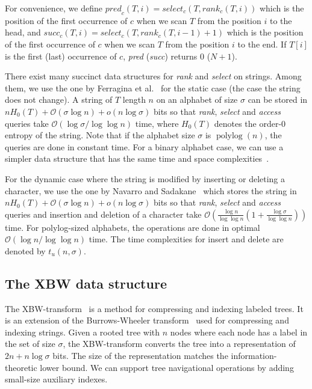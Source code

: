 \documentclass{llncs}
\newcommand{\Order}{\mathcal{O}}
\newcommand{\order}{o}
\def\polylog{{\mathop{\mathrm{polylog}}\nolimits}}
\def\rank{\textit{rank}}
\def\select{\textit{select}}
\def\access{\textit{access}}
\def\pred{\textit{pred}}
\def\succ{\textit{succ}}
\begin{document}
For convenience, we define ${\pred}_c(T,i) = {\select}_c(T, {\rank}_c(T, i))$
which is the position of the first occurrence of $c$ when we scan $T$ from the position $i$ to the head,
and ${\succ}_c(T,i) = {\select}_c(T, {\rank}_c(T, i-1)+1)$
which is the position of the first occurrence of $c$ when we scan $T$ from the position $i$ to the end.
If $T[i]$ is the first (last) occurrence of $c$, {\pred} (\succ) returns $0$ ($N+1$).


There exist many succinct data structures for {\rank} and {\select} on strings.
Among them, we use the one by Ferragina et al.~\cite{FerManMakNav06} for the static case
(the case the string does not change).  A string of $T$ length $n$ on an alphabet of size $\sigma$
can be stored in $nH_0(T) + \Order(\sigma \log n) + \order(n \log\sigma)$ bits so that
{\rank}, {\select} and {\access} queries take $\Order(\log\sigma / \log\log n)$ time,
where $H_0(T)$ denotes the order-$0$ entropy of the string.  Note that if the alphabet size $\sigma$
is $\polylog(n)$, the queries are done in constant time.  For a binary alphabet case,
we can use a simpler data structure that has the same time and space complexities~\cite{RRR07}.

For the dynamic case where the string is modified by inserting or deleting a character,
we use the one by Navarro and Sadakane~\cite{NavSad10} which stores the string
in $nH_0(T) + \Order(\sigma \log n) + \order(n \log\sigma)$ bits so that
{\rank}, {\select} and {\access} queries and insertion and deletion of a character take
$\Order(\frac{\log n}{\log \log n}(1+\frac{\log\sigma}{\log\log n}))$ time.
For polylog-sized alphabets, the operations are done in optimal $\Order(\log n/\log \log n)$ time.
The time complexities for insert and delete are denoted by $t_u(n,\sigma)$.


\subsection{The XBW data structure}
The XBW-transform~\cite{FLMM09} is a method for compressing and indexing labeled trees.
It is an extension of the Burrows-Wheeler transform~\cite{BurWhe94} used for compressing
and indexing strings.  Given a rooted tree with $n$ nodes where each node has a label in
the set of size $\sigma$, the XBW-transform converts the tree into a representation of
$2n + n \log\sigma$ bits.  The size of the representation matches the information-theoretic
lower bound.  We can support tree navigational operations by adding small-size auxiliary
indexes.
\end{document}
